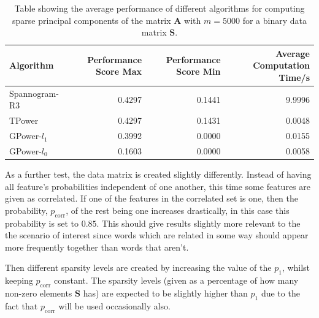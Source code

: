 \documentclass[11pt,a4paper]{article}
\newcommand{\smat}{\mathbf{S}}
\begin{document}
\begin{table}[H]
\center
\begin{tabular}{|l|r|r|r|}
\hline
Algorithm &  Performance Score Max &   Performance Score Min & Average Computation Time/s\\
\hline
  Spannogram-R3&   0.4297&    0.1441&    		9.9996\\
 TPower&   0.4297   & 0.1431   & 		0.0048\\
GPower-$l_1$   & 0.3992  &  0.0000  &  		0.0155\\
   GPower-$l_0$ &  0.1603  &  0.0000 & 		 0.0058\\
\hline

\end{tabular}
\caption{Table showing the average performance of different algorithms for computing sparse principal components of the matrix $\mathbf{A}$ with $m=5000$ for a binary data matrix $\smat$.}
\label{performance_bin_data_5000}
\end{table}

As a further test, the data matrix is created slightly differently. Instead of having all feature's probabilities independent of one another, this time some features are given as correlated. If one of the features in the correlated set is one, then the probability, $p_\text{corr}$, of the rest being one increases drastically, in this case this probability is set to $0.85$. This should give results slightly more relevant to the the scenario of interest since words which are related in some way should appear more frequently together than words that aren't. 

Then different sparsity levels are created by increasing the value of the  $p_\text{1}$, whilst keeping $p_\text{corr}$ constant. The sparsity levels (given as a percentage of how many non-zero elements $\smat$ has) are expected to be slightly higher than $p_\text{1}$ due to the fact that $p_\text{corr}$ will be used occasionally also. 
\end{document}
